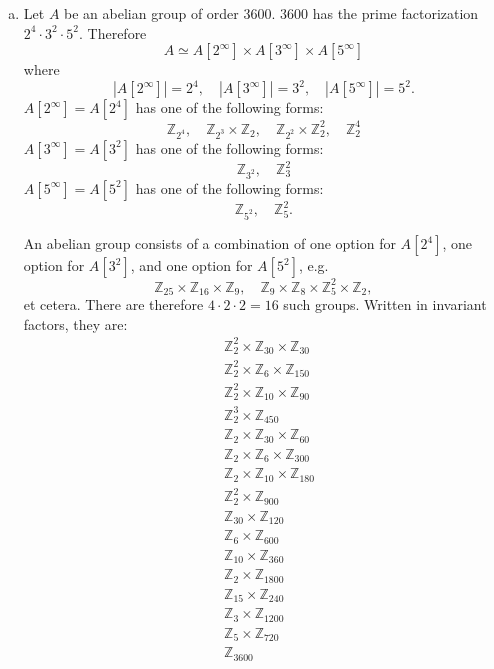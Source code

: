 \documentclass{article}
\begin{document}
\begin{Answer}
\begin{enumerate}[(a)]
  \item{
    Let $A$ be an abelian group of order 3600.
    3600 has the prime factorization $2^4 \cdot 3^2 \cdot
    5^2$. Therefore
    $$
    A \simeq A[2^\infty] \times A[3^\infty] \times A[5^\infty]
    $$
    where
    $$
    |A[2^\infty]| = 2^4, \quad
    |A[3^\infty]| = 3^2, \quad
    |A[5^\infty]| = 5^2.
    $$
    $A[2^\infty] = A[2^4]$ has one of the following forms:
    $$
    \mathbb{Z}_{2^4}, \quad
    \mathbb{Z}_{2^3} \times \mathbb{Z}_{2}, \quad
    \mathbb{Z}_{2^2} \times \mathbb{Z}_{2}^2, \quad
    \mathbb{Z}_{2}^4
    $$
    $A[3^\infty] = A[3^2]$ has one of the following forms:
    $$
    \mathbb{Z}_{3^2}, \quad \mathbb{Z}_{3}^2
    $$
    $A[5^\infty] = A[5^2]$ has one of the following forms:
    $$
    \mathbb{Z}_{5^2}, \quad \mathbb{Z}_{5}^2.
    $$

    An abelian group consists of a combination of one option for
    $A[2^4]$, one option for $A[3^2]$, and one option for $A[5^2]$, e.g.
    $$
    \mathbb{Z}_{25} \times \mathbb{Z}_{16} \times \mathbb{Z}_{9},
    \quad
    \mathbb{Z}_{9} \times \mathbb{Z}_{8} \times \mathbb{Z}_5^2 \times \mathbb{Z}_2,
    $$
    et cetera. There are therefore $4 \cdot 2 \cdot 2 = 16$ such
    groups. Written in invariant factors, they are:
    \begin{align*}
      & \mathbb{Z}_{2}^{2} \times \mathbb{Z}_{30} \times \mathbb{Z}_{30} \\
      & \mathbb{Z}_{2}^{2} \times \mathbb{Z}_{6} \times \mathbb{Z}_{150} \\
      & \mathbb{Z}_{2}^{2} \times \mathbb{Z}_{10} \times \mathbb{Z}_{90} \\
      & \mathbb{Z}_{2}^{3} \times \mathbb{Z}_{450} \\
      & \mathbb{Z}_{2} \times \mathbb{Z}_{30} \times \mathbb{Z}_{60}    \\
      & \mathbb{Z}_{2} \times \mathbb{Z}_{6} \times \mathbb{Z}_{300}    \\
      & \mathbb{Z}_{2} \times \mathbb{Z}_{10} \times \mathbb{Z}_{180}   \\
      & \mathbb{Z}_{2}^{2} \times \mathbb{Z}_{900}                      \\
      & \mathbb{Z}_{30} \times \mathbb{Z}_{120}                         \\
      & \mathbb{Z}_{6} \times \mathbb{Z}_{600}                          \\
      & \mathbb{Z}_{10} \times \mathbb{Z}_{360}                         \\
      & \mathbb{Z}_{2} \times \mathbb{Z}_{1800}                         \\
      & \mathbb{Z}_{15} \times \mathbb{Z}_{240}                         \\
      & \mathbb{Z}_{3} \times \mathbb{Z}_{1200}                         \\
      & \mathbb{Z}_{5} \times \mathbb{Z}_{720}                          \\
      & \mathbb{Z}_{3600}
    \end{align*}

}
\end{enumerate}
\end{Answer}
\end{document}
